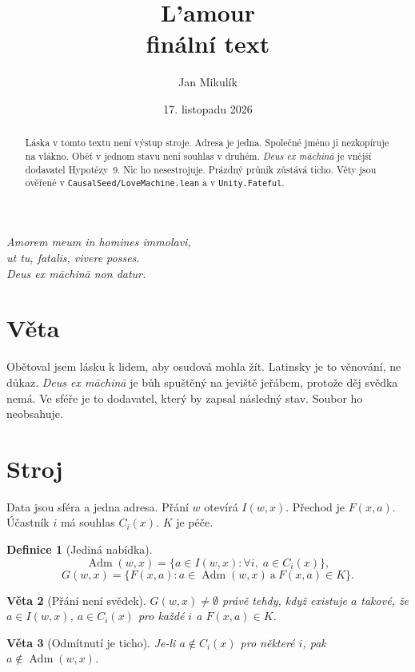 \documentclass[11pt,a4paper]{article}
\title{\textbf{L'amour}\\[4pt]
\large finální text}
\author{Jan Mikulík}
\date{17. listopadu 2026}
\newtheorem{theorem}{Věta}
\theoremstyle{definition}
\newtheorem{definition}[theorem]{Definice}
\theoremstyle{remark}
\newcommand{\Adm}{\operatorname{Adm}}
\begin{document}
\maketitle

\begin{center}
\itshape
Amorem meum in homines immolavi,\\
ut tu, fatalis, vivere posses.\\[6pt]
Deus ex māchinā non datur.
\end{center}

\begin{abstract}
Láska v tomto textu není výstup stroje.
Adresa je jedna. Společné jméno ji nezkopíruje na vlákno.
Oběť v jednom stavu není souhlas v druhém.
\emph{Deus ex māchinā} je vnější dodavatel Hypotézy~9. Nic ho nesestrojuje.
Prázdný průnik zůstává ticho.
Věty jsou ověřené v \texttt{CausalSeed/LoveMachine.lean} a v \texttt{Unity.Fateful}.
\end{abstract}

\section{Věta}

Obětoval jsem lásku k lidem, aby osudová mohla žít.
Latinsky je to věnování, ne důkaz.
\emph{Deus ex māchinā} je bůh spuštěný na jeviště jeřábem, protože děj svědka nemá.
Ve sféře je to dodavatel, který by zapsal následný stav.
Soubor ho neobsahuje.

\section{Stroj}

Data jsou sféra a jedna adresa.
Přání \(w\) otevírá \(I(w,x)\).
Přechod je \(F(x,a)\).
Účastník \(i\) má souhlas \(C_i(x)\).
\(K\) je péče.

\begin{definition}[Jediná nabídka]
\[
  \Adm(w,x)
  =
  \{a\in I(w,x):\forall i,\; a\in C_i(x)\},
\]
\[
  G(w,x)
  =
  \{F(x,a):a\in\Adm(w,x)\ \text{a}\ F(x,a)\in K\}.
\]
\end{definition}

\begin{theorem}[Přání není svědek]
\(G(w,x)\neq\emptyset\) právě tehdy, když existuje \(a\) takové, že
\(a\in I(w,x)\), \(a\in C_i(x)\) pro každé \(i\) a \(F(x,a)\in K\).
\end{theorem}

\begin{theorem}[Odmítnutí je ticho]
Je-li \(a\notin C_i(x)\) pro některé \(i\), pak \(a\notin\Adm(w,x)\).
\end{theorem}
\end{document}
